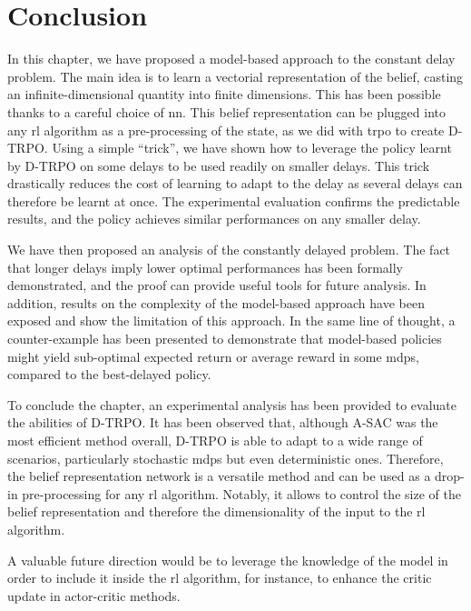 \section{Conclusion}

In this chapter, we have proposed a model-based approach to the constant delay problem.
The main idea is to learn a vectorial representation of the belief, casting an infinite-dimensional quantity into finite dimensions. 
This has been possible thanks to a careful choice of \gls{nn}.
This belief representation can be plugged into any \gls{rl} algorithm as a pre-processing of the state, as we did with \gls{trpo} to create D-TRPO.
Using a simple ``trick'', we have shown how to leverage the policy learnt by D-TRPO on some delays to be used readily on smaller delays.
This trick drastically reduces the cost of learning to adapt to the delay as several delays can therefore be learnt at once.
The experimental evaluation confirms the predictable results, and the policy achieves similar performances on any smaller delay.

We have then proposed an analysis of the constantly delayed problem.
The fact that longer delays imply lower optimal performances has been formally demonstrated, and the proof can provide useful tools for future analysis.
In addition, results on the complexity of the model-based approach have been exposed and show the limitation of this approach.  
In the same line of thought, a counter-example has been presented to demonstrate that model-based policies might yield sub-optimal expected return or average reward in some \glspl{mdp}, compared to the best-delayed policy.

To conclude the chapter, an experimental analysis has been provided to evaluate the abilities of D-TRPO. 
It has been observed that, although A-SAC was the most efficient method overall, D-TRPO is able to adapt to a wide range of scenarios, particularly stochastic \glspl{mdp} but even deterministic ones.
Therefore, the belief representation network is a versatile method and can be used as a drop-in pre-processing for any \gls{rl} algorithm. 
Notably, it allows to control the size of the belief representation and therefore the dimensionality of the input to the \gls{rl} algorithm.

A valuable future direction would be to leverage the knowledge of the model in order to include it inside the \gls{rl} algorithm, for instance, to enhance the critic update in actor-critic methods.